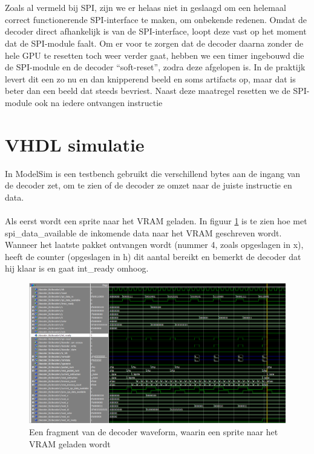 \documentclass{scrartcl} %
\begin{document}
\\
\\
Zoals al vermeld bij SPI, zijn we er helaas niet in geslaagd om een helemaal correct functionerende SPI-interface te maken, om onbekende redenen. Omdat de decoder direct afhankelijk is van de SPI-interface, loopt deze vast op het moment dat de SPI-module faalt. Om er voor te zorgen dat de decoder daarna zonder de hele GPU te resetten toch weer verder gaat, hebben we een timer ingebouwd die de SPI-module en de decoder ``soft-reset'', zodra deze afgelopen is. In de praktijk levert dit een zo nu en dan knipperend beeld en soms artifacts op, maar dat is beter dan een beeld dat steeds bevriest. Naast deze maatregel resetten we de SPI-module ook na iedere ontvangen instructie

\section{VHDL simulatie}
In ModelSim is een testbench gebruikt die verschillend bytes aan de ingang van de decoder zet, om te zien of de decoder ze omzet naar de juiste instructie en data.
\\\\
Als eerst wordt een sprite naar het VRAM geladen. In figuur \ref{fig:decoder-modelsim-lsprite} is te zien hoe met spi\_data\_available de inkomende data naar het VRAM geschreven wordt. Wanneer het laatste pakket ontvangen wordt (nummer 4, zoals opgeslagen in x), heeft de counter (opgeslagen in h) dit aantal bereikt en bemerkt de decoder dat hij klaar is en gaat int\_ready omhoog.

\begin{figure}[H]
	\centering
	\includegraphics[width=\textwidth]{resource/decoder-modelsim-lsprite.png}
	\caption{Een fragment van de decoder waveform, waarin een sprite naar het VRAM geladen wordt}
	\label{fig:decoder-modelsim-lsprite}
\end{figure}
\end{document}
